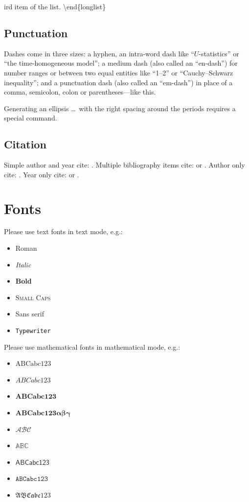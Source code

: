 \documentclass[aoas]{imsart}
\numberwithin{equation}{section}
\theoremstyle{plain}
\theoremstyle{remark}
\begin{document}
ird item of the list. \textbackslash end\{longlist\}

\hypertarget{punctuation}{%
\subsection{Punctuation}\label{punctuation}}

Dashes come in three sizes: a hyphen, an intra-word dash like
``\(U\)-statistics'' or ``the time-homogeneous model''; a medium dash
(also called an ``en-dash'') for number ranges or between two equal
entities like ``1--2'' or ``Cauchy--Schwarz inequality''; and a
punctuation dash (also called an ``em-dash'') in place of a comma,
semicolon, colon or parentheses---like this.

Generating an ellipsis \ldots~with the right spacing around the periods
requires a special command.

\hypertarget{citation}{%
\subsection{Citation}\label{citation}}

Simple author and year cite: \citet{billingsley2013convergence}.
Multiple bibliography items cite:
\cite{billingsley2013convergence,bourbaki1966general} or
\citep{billingsley2013convergence, bourbaki1966general}. Author only
cite: \citeauthor{ethier1985markov}. Year only cite:
\citeyear{prokhorov1956convergence} or
\citeyearpar{prokhorov1956convergence}.

\hypertarget{fonts}{%
\section{Fonts}\label{fonts}}

Please use text fonts in text mode, e.g.:

\begin{itemize}
\item[]\textrm{Roman}
\item[]\textit{Italic}
\item[]\textbf{Bold}
\item[]\textsc{Small Caps}
\item[]\textsf{Sans serif}
\item[]\texttt{Typewriter}
\end{itemize}

Please use mathematical fonts in mathematical mode, e.g.:

\begin{itemize}
\item[] $\mathrm{ABCabc123}$
\item[] $\mathit{ABCabc123}$
\item[] $\mathbf{ABCabc123}$
\item[] $\boldsymbol{ABCabc123\alpha\beta\gamma}$
\item[] $\mathcal{ABC}$
\item[] $\mathbb{ABC}$
\item[] $\mathsf{ABCabc123}$
\item[] $\mathtt{ABCabc123}$
\item[] $\mathfrak{ABCabc123}$
\end{itemize}
\end{document}
